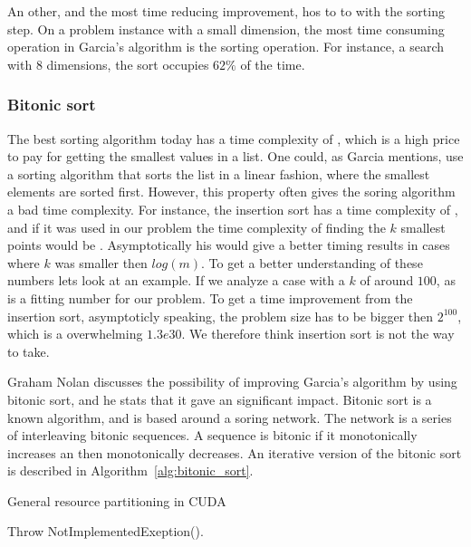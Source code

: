 An other, and the most time reducing improvement, hos to to with the sorting step. On a problem instance with a small dimension, the most time consuming operation in Garcia's algorithm is the sorting operation. For instance, a search with $8$ dimensions, the sort occupies $62\%$ of the time. 

\subsubsection{Bitonic sort} %
\label{ssub:bitonic_sort}


The best sorting algorithm today has a time complexity of , which is a high price to pay for getting the smallest values in a list.  One could, as Garcia mentions, use a sorting algorithm that sorts the list in a linear fashion, where the smallest elements are sorted first. However, this property often gives the soring algorithm a bad time complexity. For instance, the insertion sort\cite{Cormen:2001} has a time complexity of , and if it was used in our problem the time complexity of finding the $k$ smallest points would be . Asymptotically his would give a better timing results in cases where $k$ was smaller then $log(m)$. To get a better understanding of these numbers lets look at an example. If we analyze a case with a $k$ of around $100$, as is a fitting number for our problem. To get a time improvement from the insertion sort, asymptoticly speaking, the problem size has to be bigger then $2^{100}$, which is a overwhelming $1.3e30$. We therefore think insertion sort is not the way to take.

Graham Nolan discusses the possibility of improving Garcia's algorithm by using bitonic sort, and he stats that it gave an significant impact\citep{Nolan}. Bitonic sort is a known  algorithm, and is based around a soring network. The network is a series of interleaving bitonic sequences. A sequence is bitonic if it monotonically increases an then monotonically decreases\cite{Cormen:2001}. An iterative version of the bitonic sort is described in Algorithm~\ref{alg:bitonic_sort}.

\begin{algorithm}[ht]
\caption{General resource partitioning in CUDA}
\label{alg:bitonic_sort}
\begin{algorithmic}
    \State Throw NotImplementedExeption().
\end{algorithmic}
\end{algorithm}

